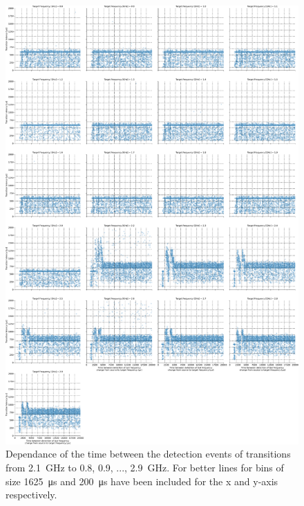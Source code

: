 \begin{figure}[]
    \centering
    \includegraphics[width=\columnwidth]{fig/ftalat_scatter_wait_transition_latency_hati_source_2.1.pdf}
    \caption{Dependance of the time between the detection events of transitions from \SI{2.1}{\GHz} to \SI{0.8}{}, \SI{0.9}{}, ..., \SI{2.9}{\GHz}. For better lines for bins of size \SI{1625}{\us} and \SI{200}{\us} have been included for the x and y-axis respectively.}
\end{figure}
